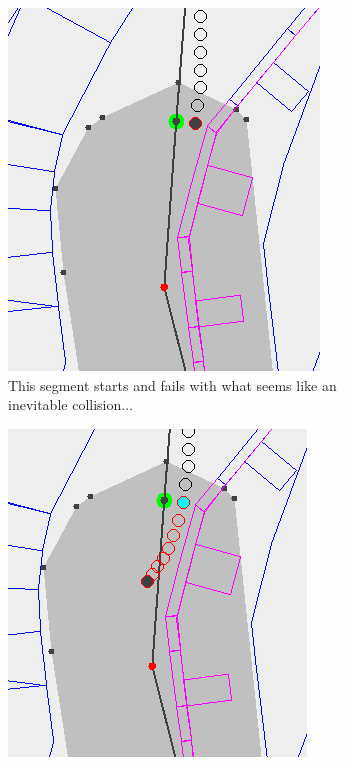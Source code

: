 \begin{figure}
	\centering
	
	\begin{subfigure}[t]{.45\textwidth}
        		\includegraphics[width=\textwidth]{img/leuven-fail-pre}
        		\caption{This segment starts and fails with what seems like an inevitable collision...}
        		\label{fig:leuven-fail-pre}
	\end{subfigure}
	\hfill
	\begin{subfigure}[t]{.45\textwidth}
        		\includegraphics[width=\textwidth]{img/leuven-fail-post}

\end{subfigure}
\end{figure}

